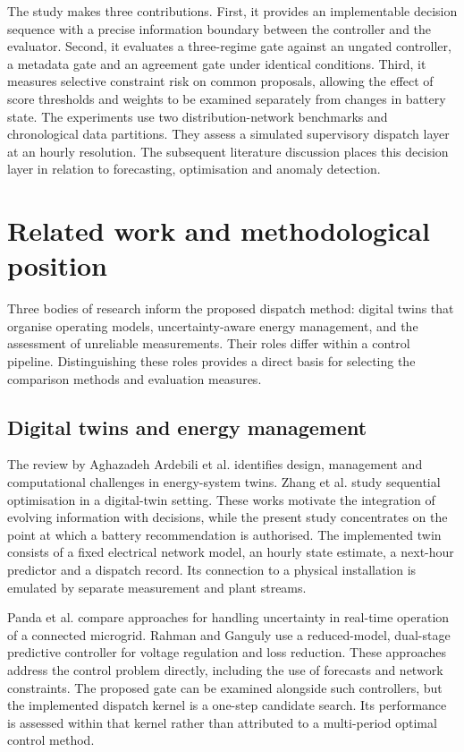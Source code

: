 \documentclass[11pt,a4paper]{article}
\begin{document}
The study makes three contributions. First, it provides an implementable decision sequence with a precise information boundary between the controller and the evaluator. Second, it evaluates a three-regime gate against an ungated controller, a metadata gate and an agreement gate under identical conditions. Third, it measures selective constraint risk on common proposals, allowing the effect of score thresholds and weights to be examined separately from changes in battery state. The experiments use two distribution-network benchmarks and chronological data partitions. They assess a simulated supervisory dispatch layer at an hourly resolution. The subsequent literature discussion places this decision layer in relation to forecasting, optimisation and anomaly detection.

\section{Related work and methodological position}\label{sec:related}
Three bodies of research inform the proposed dispatch method: digital twins that organise operating models, uncertainty-aware energy management, and the assessment of unreliable measurements. Their roles differ within a control pipeline. Distinguishing these roles provides a direct basis for selecting the comparison methods and evaluation measures.

\subsection{Digital twins and energy management}
The review by Aghazadeh Ardebili et al. \cite{ardebili} identifies design, management and computational challenges in energy-system twins. Zhang et al. \cite{zhang} study sequential optimisation in a digital-twin setting. These works motivate the integration of evolving information with decisions, while the present study concentrates on the point at which a battery recommendation is authorised. The implemented twin consists of a fixed electrical network model, an hourly state estimate, a next-hour predictor and a dispatch record. Its connection to a physical installation is emulated by separate measurement and plant streams.

Panda et al. \cite{panda} compare approaches for handling uncertainty in real-time operation of a connected microgrid. Rahman and Ganguly \cite{rahman} use a reduced-model, dual-stage predictive controller for voltage regulation and loss reduction. These approaches address the control problem directly, including the use of forecasts and network constraints. The proposed gate can be examined alongside such controllers, but the implemented dispatch kernel is a one-step candidate search. Its performance is assessed within that kernel rather than attributed to a multi-period optimal control method.
\end{document}
